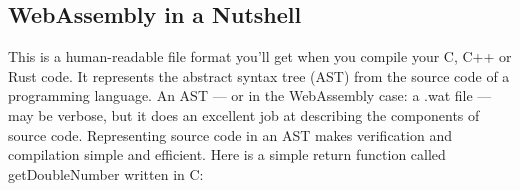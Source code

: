 \documentclass[11pt]{article}
\begin{document}
\subsection{WebAssembly in a Nutshell}
\label{sec:webassembly-text-format}

This is a human-readable file format you’ll get when you compile your C, C++ or Rust code. It represents the abstract syntax tree (AST) from the source code of a programming language. An AST — or in the WebAssembly case: a .wat file — may be verbose, but it does an excellent job at describing the components of source code. Representing source code in an AST makes verification and compilation simple and efficient. Here is a simple return function called getDoubleNumber written in C:

\pagebreak


\end{document}
